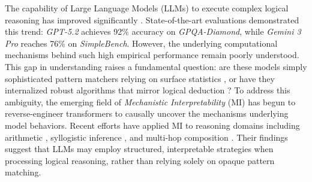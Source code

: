 \documentclass[11pt]{article}
\begin{document}

The capability of Large Language Models (LLMs) to execute complex logical reasoning has improved significantly \citep{cheng2025empoweringllmslogicalreasoning, openai2024openaio1card, deepseekai2025deepseekr1incentivizingreasoningcapability}. State-of-the-art evaluations demonstrated this trend: \textit{GPT-5.2} achieves 92\% accuracy on \textit{GPQA-Diamond}, while \textit{Gemini 3 Pro} reaches 76\% on \textit{SimpleBench}. 
However, the underlying computational mechanisms behind such high empirical performance remain poorly understood. 
This gap in understanding raises a fundamental question: are these models simply sophisticated pattern matchers relying on surface statistics \citep{bender2021stochasticparrots, dziri2023faithfatelimitstransformers, zhang2022paradoxlearningreasondata}, or have they internalized robust algorithms that mirror logical deduction \citep{li2023emergent, nanda2023progress}? 
To address this ambiguity, the emerging field of \textit{Mechanistic Interpretability} (MI) 
\citep{sharkey2025openproblemsmechanisticinterpretability}
has begun to reverse-engineer transformers to causally uncover the mechanisms underlying model behaviors. Recent efforts have applied MI to reasoning domains including arithmetic \citep{kantamneni2025languagemodelsuse, stolfo2023mechanisticinterpretationarithmeticreasoning, yu2024interpretingarithmeticmechanismcomparative}, syllogistic inference \citep{kim2024reasoningcircuitslanguage}, and multi-hop composition \citep{ye2025transformerslearnimplicit, wang2024languagemodelscan}. Their findings suggest that LLMs may employ structured, interpretable strategies when processing logical reasoning, rather than relying solely on opaque pattern matching.
\end{document}

